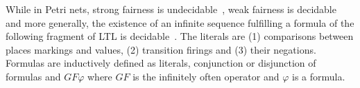 While in Petri nets, strong fairness is undecidable~\cite{carst87}, weak fairness is decidable and more generally, 
the existence of an infinite sequence fulfilling a formula of the
following fragment of LTL is decidable~\cite{Jancar90}. The literals are (1) comparisons
between places markings and values, (2) transition firings and (3)  their negations. Formulas
are inductively defined as literals, conjunction or disjunction of formulas and $GF \varphi$
where $GF$ is the infinitely often operator and $\varphi$ is a formula. 



